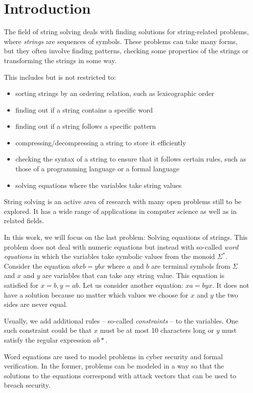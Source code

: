 \chapter{Introduction}

The field of string solving deals with finding solutions for string-related problems, where \textit{strings} are sequences of symbols.
These problems can take many forms, but they often involve finding patterns, checking some properties of the strings or transforming the strings in some way.

This includes but is not restricted to:
\begin{itemize}
    \item sorting strings by an ordering relation, such as lexicographic order
    \item finding out if a string contains a specific word
    \item finding out if a string follows a specific pattern
    \item compressing/decompressing a string to store it efficiently
    \item checking the syntax of a string to ensure that it follows certain rules, such as those of a programming language or a formal language
    \item solving equations where the variables take string values
\end{itemize}

String solving is an active area of research with many open problems still to be explored. It has a wide range of applications in computer science as well as in related fields.

In this work, we will focus on the last problem: Solving equations of strings. This problem does not deal with numeric equations but instead with so-called \textit{word equations} in which the variables take symbolic values from the monoid $\Sigma^*$. Consider the equation $abxb = ybx$ where $a$ and $b$ are terminal symbols from $\Sigma$ and $x$ and $y$ are variables that can take any string value. This equation is satisfied for $x = b, y = ab$. Let us consider another equation: $xa = byx$. It does not have a solution because no matter which values we choose for $x$ and $y$ the two sides are never equal.

Usually, we add additional rules -- so-called \textit{constraints} -- to the variables. One such constraint could be that $x$ must be at most 10 characters long or $y$ must satisfy the regular expression $ab*$.

Word equations are used to model problems in cyber security and formal verification. In the former, problems can be modeled in a way so that the solutions to the equations correspond with attack vectors that can be used to breach security.

